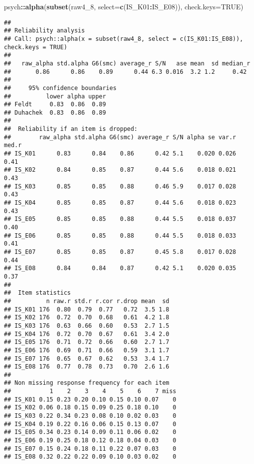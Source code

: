 \documentclass[
]{article}
\newenvironment{Shaded}{\begin{snugshade}}{\end{snugshade}}
\newcommand{\AttributeTok}[1]{\textcolor[rgb]{0.13,0.29,0.53}{#1}}
\newcommand{\ConstantTok}[1]{\textcolor[rgb]{0.56,0.35,0.01}{#1}}
\newcommand{\FunctionTok}[1]{\textcolor[rgb]{0.13,0.29,0.53}{\textbf{#1}}}
\newcommand{\NormalTok}[1]{#1}
\newcommand{\SpecialCharTok}[1]{\textcolor[rgb]{0.81,0.36,0.00}{\textbf{#1}}}
\begin{document}
\begin{Shaded}
\begin{Highlighting}[]
\NormalTok{psych}\SpecialCharTok{::}\FunctionTok{alpha}\NormalTok{(}\FunctionTok{subset}\NormalTok{(raw4\_8, }\AttributeTok{select=}\FunctionTok{c}\NormalTok{(IS\_K01}\SpecialCharTok{:}\NormalTok{IS\_E08)), }\AttributeTok{check.keys=}\ConstantTok{TRUE}\NormalTok{)}
\end{Highlighting}
\end{Shaded}

\begin{verbatim}
## 
## Reliability analysis   
## Call: psych::alpha(x = subset(raw4_8, select = c(IS_K01:IS_E08)), check.keys = TRUE)
## 
##   raw_alpha std.alpha G6(smc) average_r S/N   ase mean  sd median_r
##       0.86      0.86    0.89      0.44 6.3 0.016  3.2 1.2     0.42
## 
##     95% confidence boundaries 
##          lower alpha upper
## Feldt     0.83  0.86  0.89
## Duhachek  0.83  0.86  0.89
## 
##  Reliability if an item is dropped:
##        raw_alpha std.alpha G6(smc) average_r S/N alpha se var.r med.r
## IS_K01      0.83      0.84    0.86      0.42 5.1    0.020 0.026  0.41
## IS_K02      0.84      0.85    0.87      0.44 5.6    0.018 0.021  0.43
## IS_K03      0.85      0.85    0.88      0.46 5.9    0.017 0.028  0.43
## IS_K04      0.85      0.85    0.87      0.44 5.6    0.018 0.023  0.43
## IS_E05      0.85      0.85    0.88      0.44 5.5    0.018 0.037  0.40
## IS_E06      0.85      0.85    0.88      0.44 5.5    0.018 0.033  0.41
## IS_E07      0.85      0.85    0.87      0.45 5.8    0.017 0.028  0.44
## IS_E08      0.84      0.84    0.87      0.42 5.1    0.020 0.035  0.37
## 
##  Item statistics 
##          n raw.r std.r r.cor r.drop mean  sd
## IS_K01 176  0.80  0.79  0.77   0.72  3.5 1.8
## IS_K02 176  0.72  0.70  0.68   0.61  4.2 1.8
## IS_K03 176  0.63  0.66  0.60   0.53  2.7 1.5
## IS_K04 176  0.72  0.70  0.67   0.61  3.4 2.0
## IS_E05 176  0.71  0.72  0.66   0.60  2.7 1.7
## IS_E06 176  0.69  0.71  0.66   0.59  3.1 1.7
## IS_E07 176  0.65  0.67  0.62   0.53  3.4 1.7
## IS_E08 176  0.77  0.78  0.73   0.70  2.6 1.6
## 
## Non missing response frequency for each item
##           1    2    3    4    5    6    7 miss
## IS_K01 0.15 0.23 0.20 0.10 0.15 0.10 0.07    0
## IS_K02 0.06 0.18 0.15 0.09 0.25 0.18 0.10    0
## IS_K03 0.22 0.34 0.23 0.08 0.10 0.02 0.03    0
## IS_K04 0.19 0.22 0.16 0.06 0.15 0.13 0.07    0
## IS_E05 0.34 0.23 0.14 0.09 0.11 0.06 0.02    0
## IS_E06 0.19 0.25 0.18 0.12 0.18 0.04 0.03    0
## IS_E07 0.15 0.24 0.18 0.11 0.22 0.07 0.03    0
## IS_E08 0.32 0.22 0.22 0.09 0.10 0.03 0.02    0
\end{verbatim}
\end{document}
